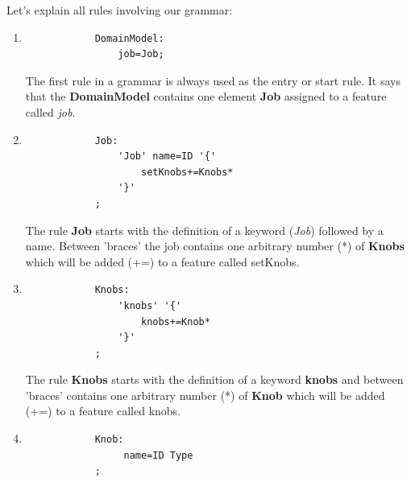 Let's explain all rules involving our grammar:
\begin{enumerate}
	\item
		\singlespacing
		\begin{listing}[H]
		\begin{verbatim}
			DomainModel:
				job=Job;
		\end{verbatim}
		\label{listing:modelRule}
		\end{listing}

		The first rule in a grammar is always used as the entry or start rule.
		It says that the \textbf{DomainModel} contains one element \textbf{Job}
		assigned to a feature called \textit{job}.

	\item
		\singlespacing
		\begin{listing}[H]
		\begin{verbatim}
			Job:
				'Job' name=ID '{'
					setKnobs+=Knobs*
				'}'
			;	
		\end{verbatim}
		\label{listing:modelRule}
		\end{listing}

		The rule \textbf{Job} starts with the definition of a keyword ({\it Job})
		followed by a name. Between 'braces' the job contains one arbitrary number
		(*) of \textbf{Knobs} which will be added (+=) to a feature called setKnobs.

	\item
		\singlespacing
		\begin{listing}[H]
		\begin{verbatim}
			Knobs:
				'knobs' '{'
					knobs+=Knob*
				'}' 
			;
		\end{verbatim}
		\label{listing:modelRule}
		\end{listing}

		The rule \textbf{Knobs} starts with the definition of a keyword {\bf knobs}
		and between 'braces' contains one arbitrary number (*) of \textbf{Knob}
		which will be added (+=) to a feature called knobs.

	\item
		\singlespacing
		\begin{listing}[H]
		\begin{verbatim}
			Knob:
				 name=ID Type
			;
		\end{verbatim}
		\label{listing:modelRule}
		\end{listing}


\end{enumerate}
